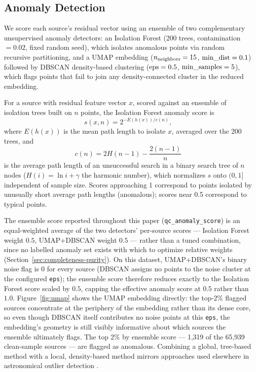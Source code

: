 \documentclass[twocolumn]{aastex631}
\begin{document}
\subsection{Anomaly Detection}
\label{sec:anomaly-detection}

We score each source's residual vector using an ensemble of two
complementary unsupervised anomaly detectors: an Isolation Forest (200
trees, contamination $=0.02$, fixed random seed), which isolates anomalous
points via random recursive partitioning, and a UMAP embedding
($n_{\rm neighbors}=15$, $\rm min\_dist=0.1$) followed by DBSCAN
density-based clustering ($\rm eps=0.5$, $\rm min\_samples=5$), which flags
points that fail to join any density-connected cluster in the reduced
embedding.

For a source with residual feature vector $x$, scored against an ensemble
of isolation trees built on $n$ points, the Isolation Forest anomaly score
is \citep{Liu2008}
\begin{equation}
s(x, n) = 2^{-E(h(x))/c(n)},
\label{eq:isoforest}
\end{equation}
where $E(h(x))$ is the mean path length to isolate $x$, averaged over the
200 trees, and
\begin{equation}
c(n) = 2H(n-1) - \frac{2(n-1)}{n}
\label{eq:isoforest-norm}
\end{equation}
is the average path length of an unsuccessful search in a binary search
tree of $n$ nodes ($H(i)=\ln i + \gamma$ the harmonic number), which
normalizes $s$ onto $(0,1]$ independent of sample size. Scores approaching
1 correspond to points isolated by unusually short average path lengths
(anomalous); scores near 0.5 correspond to typical points.

The ensemble score reported throughout this paper (\texttt{qc\_anomaly\_score})
is an equal-weighted average of the two detectors' per-source scores ---
Isolation Forest weight $0.5$, UMAP+DBSCAN weight $0.5$ --- rather than a
tuned combination, since no labelled anomaly set exists with which to
optimize relative weights (Section~\ref{sec:completeness-purity}). On this
dataset, UMAP+DBSCAN's binary noise flag is 0 for every source (DBSCAN
assigns no points to the noise cluster at the configured \texttt{eps}); the
ensemble score therefore reduces exactly to the Isolation Forest score
scaled by $0.5$, capping the effective anomaly score at $0.5$ rather than
$1.0$. Figure~\ref{fig:umap} shows the UMAP embedding directly: the top-2\%
flagged sources concentrate at the periphery of the embedding rather than
its dense core, so even though DBSCAN itself contributes no noise points at
this \texttt{eps}, the embedding's geometry is still visibly informative
about which sources the ensemble ultimately flags. The top 2\% by ensemble
score --- 1,319 of the 65,939 clean-sample sources --- are flagged as
anomalous. Combining a global, tree-based method with a local,
density-based method mirrors approaches used elsewhere in astronomical
outlier detection \citep{BaronPoznanski2017, Liang2023}.
\end{document}
